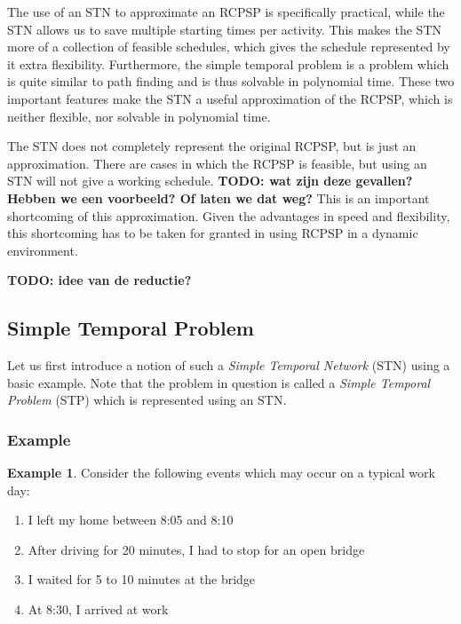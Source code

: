 \documentclass{article}
\theoremstyle{definition}
\newcommand{\TODO}[1]{{\color{red}\textbf{TODO: #1}}}
\newtheorem{example}{Example}[section]
\begin{document}
The use of an STN to approximate an RCPSP is specifically practical, while the STN allows us to save multiple starting times per activity.
This makes the STN more of a collection of feasible schedules, which gives the schedule represented by it extra flexibility.
Furthermore, the simple temporal problem is a problem which is quite similar to path finding and is thus solvable in polynomial time.
These two important features make the STN a useful approximation of the RCPSP, which is neither flexible, nor solvable in polynomial time.

The STN does not completely represent the original RCPSP, but is just an approximation.
There are cases in which the RCPSP is feasible, but using an STN will not give a working schedule.
\TODO{wat zijn deze gevallen? Hebben we een voorbeeld? Of laten we dat weg?}
This is an important shortcoming of this approximation.
Given the advantages in speed and flexibility, this shortcoming has to be taken for granted in using RCPSP in a dynamic environment.

\TODO{idee van de reductie?}

\subsection{Simple Temporal Problem}
Let us first introduce a notion of such a \emph{Simple Temporal Network} (STN) using a basic example. 
Note that the problem in question is called a \emph{Simple Temporal Problem} (STP) which is represented using an STN.

\subsubsection{Example}
\begin{example}
\label{exmp:stn}
Consider the following events which may occur on a typical work day:
\begin{enumerate}
\item I left my home between 8:05 and 8:10
\item After driving for 20 minutes, I had to stop for an open bridge
\item I waited for 5 to 10 minutes at the bridge
\item At 8:30, I arrived at work 
\end{enumerate}
\end{example}
\end{document}
